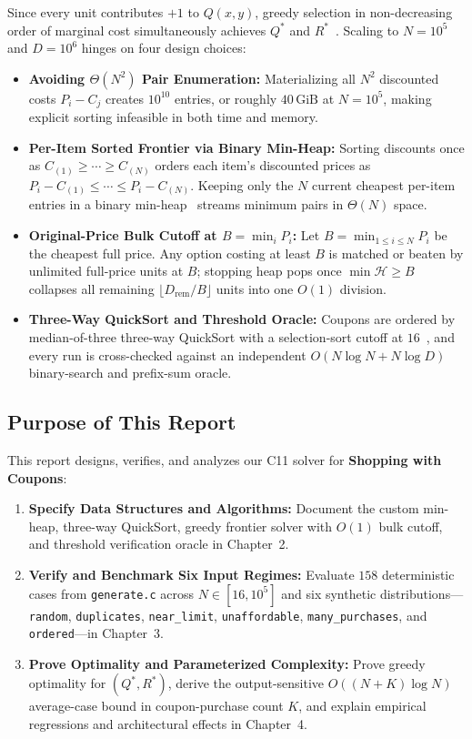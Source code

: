 \documentclass[10pt, a4paper]{article}
\newcommand{\code}[1]{\texttt{\color{primary!90!black}#1}}
\begin{document}
Since every unit contributes $+1$ to $Q(x, y)$, greedy selection in non-decreasing order of marginal cost simultaneously achieves $Q^*$ and $R^*$~\cite{ads_slides2026, cormen2022}. Scaling to $N = 10^5$ and $D = 10^6$ hinges on four design choices:
\begin{itemize}
  \item \textbf{\color{primary}Avoiding $\Theta(N^2)$ Pair Enumeration:} Materializing all $N^2$ discounted costs $P_i - C_j$ creates $10^{10}$ entries, or roughly $40\,\text{GiB}$ at $N = 10^5$, making explicit sorting infeasible in both time and memory.
  \item \textbf{\color{primary}Per-Item Sorted Frontier via Binary Min-Heap:} Sorting discounts once as $C_{(1)} \ge \cdots \ge C_{(N)}$ orders each item's discounted prices as $P_i - C_{(1)} \le \cdots \le P_i - C_{(N)}$. Keeping only the $N$ current cheapest per-item entries in a binary min-heap~\cite{ads_slides2026, weiss1996} streams minimum pairs in $\Theta(N)$ space.
  \item \textbf{\color{primary}Original-Price Bulk Cutoff at $B = \min_i P_i$:} Let $B = \min_{1 \le i \le N} P_i$ be the cheapest full price. Any option costing at least $B$ is matched or beaten by unlimited full-price units at $B$; stopping heap pops once $\min \mathcal{H} \ge B$ collapses all remaining $\lfloor D_{\text{rem}} / B \rfloor$ units into one $O(1)$ division.
  \item \textbf{\color{primary}Three-Way QuickSort and Threshold Oracle:} Coupons are ordered by median-of-three three-way QuickSort with a selection-sort cutoff at $16$~\cite{weiss1996, cormen2022}, and every run is cross-checked against an independent $O(N \log N + N \log D)$ binary-search and prefix-sum oracle.
\end{itemize}

\subsection{Purpose of This Report}
This report designs, verifies, and analyzes our C11 solver for \textbf{Shopping with Coupons}:
\begin{enumerate}[label=\textbf{\color{primary}\arabic*.}]
  \item \textbf{Specify Data Structures and Algorithms:} Document the custom min-heap, three-way QuickSort, greedy frontier solver with $O(1)$ bulk cutoff, and threshold verification oracle in Chapter~2.
  \item \textbf{Verify and Benchmark Six Input Regimes:} Evaluate $158$ deterministic cases from \code{generate.c} across $N \in [16, 10^5]$ and six synthetic distributions---\code{random}, \code{duplicates}, \code{near\_limit}, \code{unaffordable}, \code{many\_purchases}, and \code{ordered}---in Chapter~3.
  \item \textbf{Prove Optimality and Parameterized Complexity:} Prove greedy optimality for $(Q^*, R^*)$, derive the output-sensitive $O((N + K)\log N)$ average-case bound in coupon-purchase count $K$, and explain empirical regressions and architectural effects in Chapter~4.
\end{enumerate}
\end{document}
